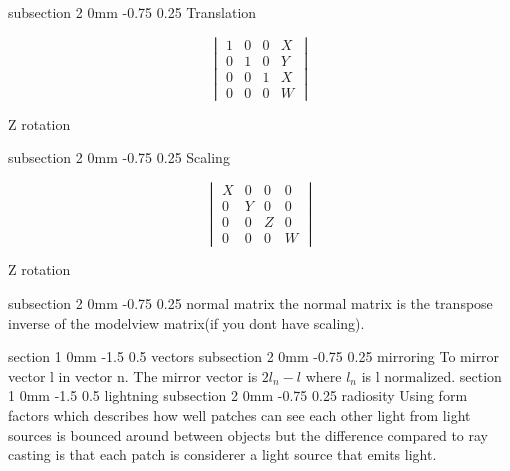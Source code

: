\documentclass[a4paper,11pt]{article}
\makeatletter
\renewcommand{\section}{\@startsection
   {section}%
   {1}%
   {0mm}%
   {-1.5\baselineskip}%
   {0.5\baselineskip}%
   {\sffamily\bfseries\upshape\normalsize}}%
\renewcommand{\subsection}{\@startsection
   {subsection}%
   {2}%
   {0mm}%
   {-0.75\baselineskip}%
   {0.25\baselineskip}%
   {\rmfamily\normalfont\slshape\normalsize}}%
\makeatother
\begin{document}
\subsection{Translation}

\begin{table}[H]
$$ \begin{vmatrix} 1&0&0&X\\ 0&1&0&Y\\0&0&1&X\\0&0&0&W \end{vmatrix}$$
  \caption{Z rotation}
\end{table}

\subsection{Scaling}
\begin{table}[H]
$$ \begin{vmatrix} X&0&0&0\\ 0&Y&0&0\\0&0&Z&0\\0&0&0&W \end{vmatrix}$$
  \caption{Z rotation}
\end{table}

\subsection{normal matrix}
the normal matrix is the transpose inverse of the modelview matrix(if you dont have scaling).

\section{vectors}
\subsection{mirroring}
To mirror vector l in vector n. The mirror vector is $2l_n-l$ where $l_n$ is l normalized.
\section{lightning}
\subsection{radiosity}
Using form factors which describes how well patches can see each other light from light sources is bounced around between objects but the difference compared to ray casting is that each patch is considerer a light source that emits light.
\end{document}
